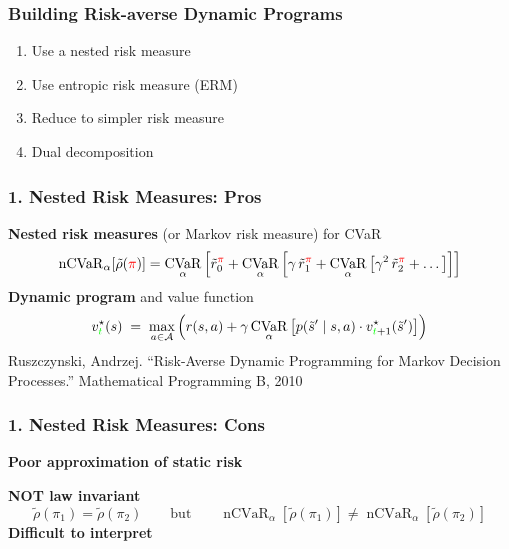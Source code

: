 \documentclass{beamer}
\newcommand{\opt}{^{\star}}
\newcommand{\tc}[2]{\textcolor{#1}{#2}}
\newcommand{\tcr}[1]{\tc{red}{#1}}
\newcommand{\tcg}[1]{\tc{green}{#1}}
\DeclareMathOperator{\cvaro}{CVaR}
\newcommand{\cvar}[2]{\cvaro_{#1} \left[#2\right]}
\begin{document}
\begin{frame} \frametitle{Building Risk-averse Dynamic Programs}
  \begin{enumerate}
  \item Use a nested risk measure
    \vfill 
  \item Use entropic risk measure (ERM)
    \vfill
  \item Reduce to simpler risk measure
    \vfill 
  \item Dual decomposition
  \end{enumerate}
\end{frame}

\begin{frame} \frametitle{1. Nested Risk Measures: Pros}
   \textbf{Nested risk measures} (or Markov risk measure) for CVaR
  \[
    \operatorname{nCVaR}_{\alpha}[\tilde{\rho}(\tcr\pi)] =
    \cvar{\alpha}{\tilde{r}_0^{\tcr\pi}  + \cvar{\alpha}{\gamma \, \tilde{r}_1^{\tcr\pi} + \cvar{\alpha}{\gamma^2 \, \tilde{r}_2^{\tcr\pi} + \dots }}}
  \]
  \vfill
  \textbf{Dynamic program} and value function
  \[
   v_{\tcg{t}}\opt(s) \;=\; \max_{a\in \mathcal{A}} \left(  r(s,a) + \gamma \cvar{\alpha}{p(\tilde{s}' \mid s,a) \cdot  v_{\tcg{t}+1}\opt(\tilde{s}')}\right)
 \]
 \vfill 
  {\tiny Ruszczynski, Andrzej. “Risk-Averse Dynamic Programming for Markov Decision Processes.” Mathematical Programming B, 2010
}
\end{frame}

\begin{frame} \frametitle{1. Nested Risk Measures: Cons}
  \textbf{Poor approximation of static risk}
  \begin{center}
  \end{center}
  \vfill 
  \textbf{NOT law invariant}
  \[
    \tilde{\rho}(\pi_1) = \tilde{\rho}(\pi_2)
    \qquad \text{but} \qquad 
    \operatorname{nCVaR}_{\alpha}[ \tilde{\rho}(\pi_1) ] \neq \operatorname{nCVaR}_{\alpha}[ \tilde{\rho}(\pi_2) ]
  \]
  \vfill
  \textbf{Difficult to interpret}
\end{frame}
\end{document}
